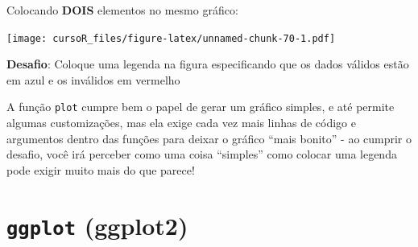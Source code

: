 \documentclass[]{book}
\newenvironment{Shaded}{\begin{snugshade}}{\end{snugshade}}
\newcommand{\KeywordTok}[1]{\textcolor[rgb]{0.13,0.29,0.53}{\textbf{#1}}}
\newcommand{\DataTypeTok}[1]{\textcolor[rgb]{0.13,0.29,0.53}{#1}}
\newcommand{\DecValTok}[1]{\textcolor[rgb]{0.00,0.00,0.81}{#1}}
\newcommand{\StringTok}[1]{\textcolor[rgb]{0.31,0.60,0.02}{#1}}
\newcommand{\CommentTok}[1]{\textcolor[rgb]{0.56,0.35,0.01}{\textit{#1}}}
\newcommand{\OperatorTok}[1]{\textcolor[rgb]{0.81,0.36,0.00}{\textbf{#1}}}
\newcommand{\NormalTok}[1]{#1}
\begin{document}
Colocando \textbf{DOIS} elementos no mesmo gráfico:

\begin{Shaded}
\end{Shaded}

\texttt{[image: cursoR\_files/figure-latex/unnamed-chunk-70-1.pdf]}

\textbf{Desafio}: Coloque uma legenda na figura especificando que os
dados válidos estão em azul e os inválidos em vermelho

A função \texttt{plot} cumpre bem o papel de gerar um gráfico simples, e
até permite algumas customizações, mas ela exige cada vez mais linhas de
código e argumentos dentro das funções para deixar o gráfico ``mais
bonito'' - ao cumprir o desafio, você irá perceber como uma coisa
``simples'' como colocar uma legenda pode exigir muito mais do que
parece!

\section{\texorpdfstring{\texttt{ggplot}
(ggplot2)}{ggplot (ggplot2)}}\label{ggplot-ggplot2}
\end{document}
